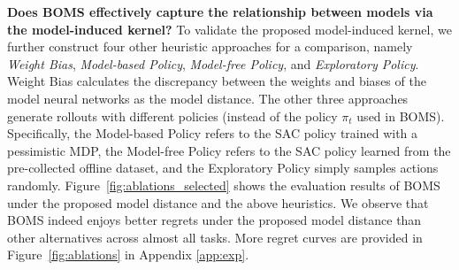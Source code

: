 


\vspace{1mm}
\noindent\textbf{{Does BOMS effectively capture the relationship between models via the model-induced kernel?}}
To validate the proposed model-induced kernel, we further construct four other heuristic approaches for a comparison, namely \textit{Weight Bias}, \textit{Model-based Policy}, \textit{Model-free Policy}, and \textit{Exploratory Policy}. Weight Bias calculates the discrepancy between the weights and biases of the model neural networks as the model distance. The other three approaches generate rollouts with different policies (instead of the policy $\pi_t$ used in BOMS). Specifically, the Model-based Policy refers to the SAC policy trained with a pessimistic MDP, the Model-free Policy refers to the SAC policy learned from the pre-collected offline dataset, and the Exploratory Policy simply samples actions randomly. 
Figure~\ref{fig:ablations_selected} shows the evaluation results of BOMS under the proposed model distance and the above heuristics. We observe that BOMS indeed enjoys better regrets under the proposed model distance than other alternatives across almost all tasks. More regret curves are provided in Figure~\ref{fig:ablations} in Appendix \ref{app:exp}.




